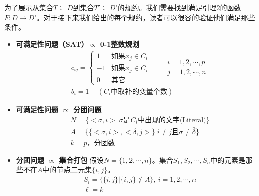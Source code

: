\documentclass[twocolumn]{article}
\theoremstyle{nonumberplain}%
\begin{document}
    为了展示从集合$T\subseteq D$到集合$T'\subseteq D'$的规约。我们需要找到满足引理2的函数$F:D\rightarrow D'$。对于接下来我们给出的每个规约，读者可以很容的验证他们满足那些条件。
    \begin{itemize}
    \item {\bf 可满足性问题（SAT）$\propto$ 0-1整数规划}
        \begin{equation}\nonumber %
        \begin{aligned}
            &c_{ij}=\left\{
            \begin{matrix}
              1 & \text{如果}x_j\in C_i \\
              -1 & \text{如果}\bar{x_j}\in C_i \\
              0 & \text{其它}
            \end{matrix}
            \right.
            \qquad
            \begin{matrix}
              i=1,2,\cdots,p\\
              j=1,2,\cdots,n
            \end{matrix}
            \\
            &b_i=1-(C_i\text{中取补的变量个数})
        \end{aligned}
        \end{equation}

    \item {\bf 可满足性问题 $\propto$ 分团问题}
        \begin{equation}\nonumber %
        \begin{aligned}
        & N = \{<\sigma,i>|\sigma\text{是}C_i\text{中出现的文字(Literal)}\} \\
        & A = \{\{<\sigma,i>,<\delta,j>\}|i\neq j\text{且}\sigma\neq\bar{\delta}\} \\
        & k = p\text{，分团数}
        \end{aligned}
        \end{equation}

    \item {\bf 分团问题 $\propto$ 集合打包}
        假设$N=\{1,2,\cdots,n\}$。集合$S_1,S_2,\cdots,S_n$中的元素是那些不在$A$中的节点二元集$\{i,j\}$。
        \begin{equation}\nonumber %
        \begin{aligned}
        & S_i=\{\{i,j\}|\{i,j\}\notin A\},\ i=1,2,\cdots,n\\
        & \ell=k
        \end{aligned}
        \end{equation}


\end{itemize}
\end{document}
